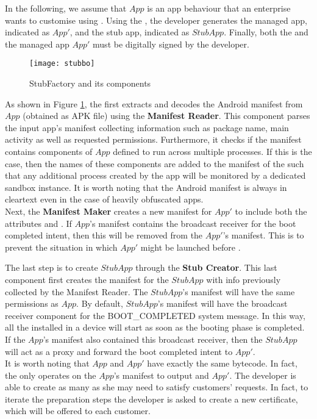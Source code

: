 In the following, we assume that $App$  is an app behaviour that an enterprise wants to customise using \asd. Using the \stubMaker, the developer generates the managed app, indicated as $App'$, and the stub app, indicated as $StubApp$. Finally, both the \stub and the managed app $App'$  must be digitally signed by the developer. 

\begin{figure}[H]
\centering
\texttt{[image: stubbo]}
\caption{StubFactory and its components}
\label{fig:stubfact}
\end{figure}

As shown in Figure \ref{fig:stubfact}, the \stubMaker first extracts and decodes the Android manifest from $App$ (obtained as APK file) using the \textbf{Manifest Reader}. This component parses the input app's manifest collecting information such as  package name, main activity as well as requested permissions. Furthermore, it checks if the manifest contains components of $App$ defined to run across multiple processes. If this is the case, then the names of these components are added to the manifest of the \stub such that any additional process created by the app will be monitored by a dedicated sandbox instance. It is worth noting that the Android manifest is always in cleartext even in the case of heavily obfuscated apps. \\

Next, the \textbf{Manifest Maker} creates a new  manifest for $App'$ to include both the attributes \shared and \proc. If $App$'s manifest contains the broadcast receiver for the boot completed intent, then this will be removed from the $App'$'s manifest. This is to prevent the situation in which $App'$ might be launched before \stub. 

The last step is to create $StubApp$ through the \textbf{Stub Creator}. This last component first creates the manifest for the $StubApp$ with info previously collected by the Manifest Reader. The  $StubApp$'s manifest will have the same permissions as $App$. By default, $StubApp$'s manifest will have the broadcast receiver component for the BOOT\_COMPLETED system message. In this way, all the \stub installed in a device will start as soon as the booting phase is completed. If the $App$'s manifest also contained this broadcast receiver, then the $StubApp$ will act as a proxy and forward the boot completed intent to $App'$. \\

It is worth noting that $App$ and $App'$ have exactly the same  bytecode. In fact, the \stubMaker only operates on the $App$'s manifest to output \stub and  $App'$.  
The developer is able to create as many \stub as she may need to satisfy customers' requests. In fact, to iterate the preparation steps the developer is asked to create a new certificate, which will be offered to each customer.

